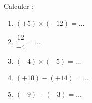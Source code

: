
\begin{exercice}\label{exosmath-0816}

    Calculer :
    \begin{enumerate}
        \item
            \( (+5)\times (-12)=\ldots\)
        \item
            \( \dfrac{ 12 }{ -4 }=\ldots\)
        \item
            \( (-4)\times (-5)=\ldots\)
        \item
            \( (+10)-(+14)=\ldots\)
        \item
            \( (-9)+(-3)=\ldots\)
    \end{enumerate}


\end{exercice}

